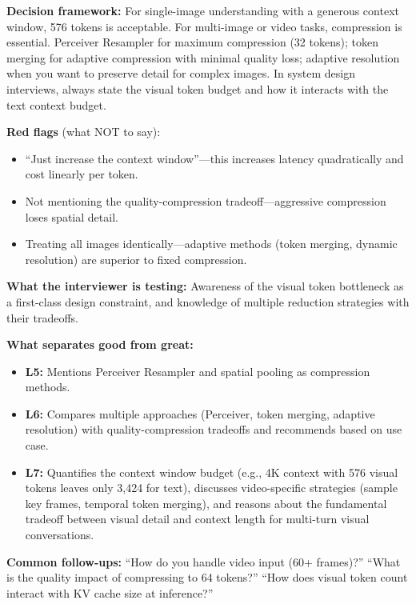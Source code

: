 \begin{interviewq}
\textbf{Decision framework:} For single-image understanding with a generous context window, 576 tokens is acceptable. For multi-image or video tasks, compression is essential. Perceiver Resampler for maximum compression (32 tokens); token merging for adaptive compression with minimal quality loss; adaptive resolution when you want to preserve detail for complex images. In system design interviews, always state the visual token budget and how it interacts with the text context budget.

\textbf{Red flags} (what NOT to say):
\begin{itemize}
    \item ``Just increase the context window''---this increases latency quadratically and cost linearly per token.
    \item Not mentioning the quality-compression tradeoff---aggressive compression loses spatial detail.
    \item Treating all images identically---adaptive methods (token merging, dynamic resolution) are superior to fixed compression.
\end{itemize}

\textbf{What the interviewer is testing:} Awareness of the visual token bottleneck as a first-class design constraint, and knowledge of multiple reduction strategies with their tradeoffs.

\textbf{What separates good from great:}
\begin{itemize}
    \item \textbf{L5:} Mentions Perceiver Resampler and spatial pooling as compression methods.
    \item \textbf{L6:} Compares multiple approaches (Perceiver, token merging, adaptive resolution) with quality-compression tradeoffs and recommends based on use case.
    \item \textbf{L7:} Quantifies the context window budget (e.g., 4K context with 576 visual tokens leaves only 3,424 for text), discusses video-specific strategies (sample key frames, temporal token merging), and reasons about the fundamental tradeoff between visual detail and context length for multi-turn visual conversations.
\end{itemize}

\textbf{Common follow-ups:} ``How do you handle video input (60+ frames)?'' ``What is the quality impact of compressing to 64 tokens?'' ``How does visual token count interact with KV cache size at inference?''
\end{interviewq}

